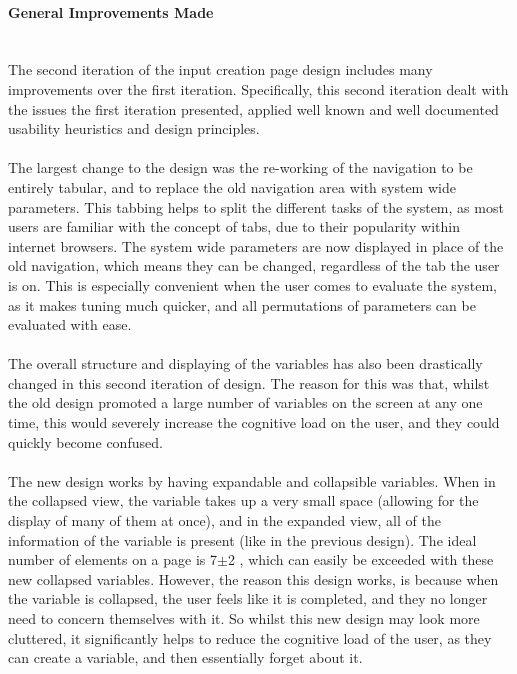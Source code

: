 \paragraph{General Improvements Made}\ \\
The second iteration of the input creation page design includes many improvements over the first iteration. Specifically, this second iteration dealt with the issues the first iteration presented, applied well known and well documented usability heuristics and design principles. \ \\
\ \\
The largest change to the design was the re-working of the navigation to be entirely tabular, and to replace the old navigation area with system wide parameters. This tabbing helps to split the different tasks of the system, as most users are familiar with the concept of tabs, due to their popularity within internet browsers. The system wide parameters are now displayed in place of the old navigation, which means they can be changed, regardless of the tab the user is on. This is especially convenient when the user comes to evaluate the system, as it makes tuning much quicker, and all permutations of parameters can be evaluated with ease.\ \\
\ \\
The overall structure and displaying of the variables has also been drastically changed in this second iteration of design. The reason for this was that, whilst the old design promoted a large number of variables on the screen at any one time, this would severely increase the cognitive load on the user, and they could quickly become confused.\ \\
\ \\
The new design works by having expandable and collapsible variables. When in the collapsed view, the variable takes up a very small space (allowing for the display of many of them at once), and in the expanded view, all of the information of the variable is present (like in the previous design). The ideal number of elements on a page is 7$\pm$2 \cite{miller1956magical}, which can easily be exceeded with these new collapsed variables. However, the reason this design works, is because when the variable is collapsed, the user feels like it is completed, and they no longer need to concern themselves with it. So whilst this new design may look more cluttered, it significantly helps to reduce the cognitive load of the user, as they can create a variable, and then essentially forget about it.\ \\
